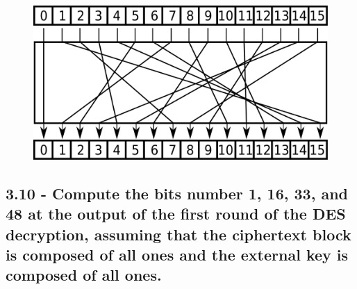 \documentclass[
    article,            %
    11pt,               %
    oneside,            %
    a4paper,            %
    english,            %
    brazil,             %
    sumario=tradicional,
    ]{abntex2}
\begin{document}
\begin{figure}[H]
    \label{fig_diagram}
    \begin{center}
        \includegraphics[scale=0.25]{imgs/diagram.pdf}
    \end{center}
\end{figure}

\subsection*{\textbf{3.10 - Compute the bits number 1, 16, 33, and 48 at the output of the first round of the DES decryption, assuming that the ciphertext block is composed of all ones and the external key is composed of all ones.}}
\end{document}
